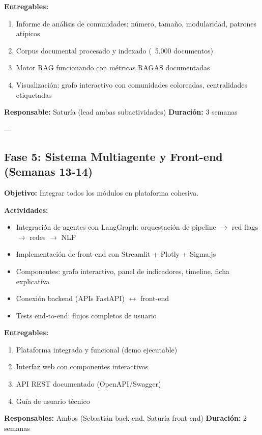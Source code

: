 \documentclass[11pt,a4paper,spanish]{book}
\numberwithin{equation}{chapter}
\numberwithin{figure}{chapter}
\begin{document}
\textbf{Entregables:}
\begin{enumerate}
\item Informe de análisis de comunidades: número, tamaño, modularidad, patrones atípicos
\item Corpus documental procesado y indexado (~5.000 documentos)
\item Motor RAG funcionando con métricas RAGAS documentadas
\item Visualización: grafo interactivo con comunidades coloreadas, centralidades etiquetadas
\end{enumerate}

\textbf{Responsable:} Saturía (lead ambas subactividades)
\textbf{Duración:} 3 semanas

---

\subsection{Fase 5: Sistema Multiagente y Front-end (Semanas 13-14)}

\textbf{Objetivo:} Integrar todos los módulos en plataforma cohesiva.

\textbf{Actividades:}
\begin{itemize}
\item Integración de agentes con LangGraph: orquestación de pipeline $\rightarrow$ red flags $\rightarrow$ redes $\rightarrow$ NLP
\item Implementación de front-end con Streamlit + Plotly + Sigma.js
\item Componentes: grafo interactivo, panel de indicadores, timeline, ficha explicativa
\item Conexión backend (APIs FastAPI) $\leftrightarrow$ front-end
\item Tests end-to-end: flujos completos de usuario
\end{itemize}

\textbf{Entregables:}
\begin{enumerate}
\item Plataforma integrada y funcional (demo ejecutable)
\item Interfaz web con componentes interactivos
\item API REST documentado (OpenAPI/Swagger)
\item Guía de usuario técnico
\end{enumerate}

\textbf{Responsables:} Ambos (Sebastián back-end, Saturía front-end)
\textbf{Duración:} 2 semanas
\end{document}
